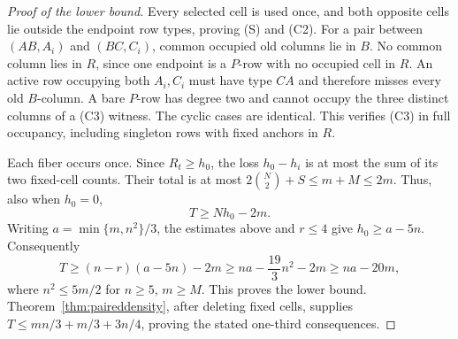 \documentclass[11pt]{article}
\begin{document}
\begin{proof}[Proof of the lower bound]
Every selected cell is used once, and both opposite cells lie outside
the endpoint row types, proving (S) and (C2). For a pair between
$(AB,A_i)$ and $(BC,C_i)$, common occupied old columns lie in $B$.
No common column lies in $R$, since one endpoint is a $P$-row with
no occupied cell in $R$. An active row occupying both $A_i,C_i$ must
have type $CA$ and therefore misses every old $B$-column. A bare
$P$-row has degree two and cannot occupy the three distinct columns
of a (C3) witness. The cyclic cases are identical. This verifies (C3)
in full occupancy, including singleton rows with fixed anchors in $R$.

Each fiber occurs once. Since $R_t\ge h_0$, the loss $h_0-h_i$ is at
most the sum of its two fixed-cell counts. Their total is at most
$2\binom N2+S\le m+M\le2m$. Thus, also when $h_0=0$,
\[
 T\ge Nh_0-2m.
\]
Writing $a=\min\{m,n^2\}/3$, the estimates above and $r\le4$ give
$h_0\ge a-5n$. Consequently
\[
 T\ge(n-r)(a-5n)-2m\ge na-\frac{19}{3}n^2-2m\ge na-20m,
\]
where $n^2\le5m/2$ for $n\ge5$, $m\ge M$. This proves the lower bound.
Theorem~\ref{thm:paireddensity}, after deleting fixed cells, supplies
$T\le mn/3+m/3+3n/4$, proving the stated one-third consequences.
\end{proof}
\end{document}
